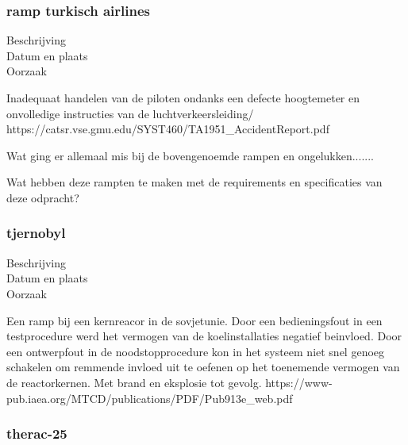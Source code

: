 \subsubsection{ramp turkisch airlines}

	\begin{description}
	\item[Beschrijving]
	\item[Datum en plaats] 
	\item[Oorzaak]
\end{description}
Inadequaat handelen van de piloten ondanks een defecte hoogtemeter en onvolledige instructies van de luchtverkeersleiding/
https://catsr.vse.gmu.edu/SYST460/TA1951_AccidentReport.pdf 

Wat ging er allemaal mis bij de bovengenoemde rampen en ongelukken....... 

Wat hebben deze rampten te maken met de requirements en specificaties van deze odpracht? 



\subsubsection{tjernobyl}

	\begin{description}
	\item[Beschrijving]
	\item[Datum en plaats] 
	\item[Oorzaak]
\end{description}
Een ramp bij een kernreacor in de sovjetunie. Door een bedieningsfout in een testprocedure werd het vermogen van de koelinstallaties negatief beinvloed. Door een ontwerpfout in de noodstopprocedure kon in het systeem niet snel genoeg schakelen om remmende invloed uit te oefenen op het toenemende vermogen van de reactorkernen. Met brand en eksplosie tot gevolg.
https://www-pub.iaea.org/MTCD/publications/PDF/Pub913e_web.pdf 



\subsubsection{therac-25}

